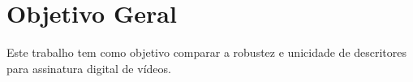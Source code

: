 

    
    








\section{Objetivo Geral}
Este trabalho tem como objetivo comparar a robustez e unicidade de descritores para assinatura digital de vídeos.

